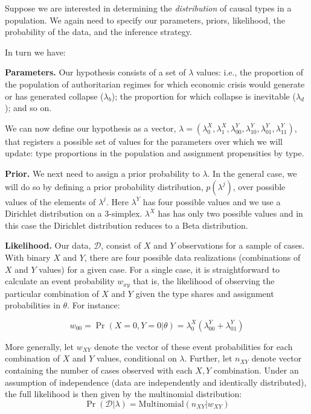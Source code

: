 \documentclass[12pt,]{book}
\begin{document}
Suppose we are interested in determining the \emph{distribution} of causal types in a population. We again need to specify our parameters, priors, likelihood, the probability of the data, and the inference strategy.

In turn we have:

\textbf{Parameters.} Our hypothesis consists of a set of \(\lambda\) values: i.e., the proportion of the population of authoritarian regimes for which economic crisis would generate or has generated collapse (\(\lambda_b\)); the proportion for which collapse is inevitable (\(\lambda_d\)); and so on.

We can now define our hypothesis as a vector, \(\lambda = (\lambda^X_0,\lambda^X_1,\lambda^Y_{00},\lambda^Y_{10},\lambda^Y_{01}, \lambda^Y_{11})\), that registers a possible set of values for the parameters over which we will update: type proportions in the population and assignment propensities by type.

\textbf{Prior.} We next need to assign a prior probability to \(\lambda\). In the general case, we will do so by defining a prior probability distribution, \(p(\lambda^j)\), over possible values of the elements of \(\lambda^j\). Here \(\lambda^Y\) has four possible values and we use a Dirichlet distribution on a 3-simplex. \(\lambda^X\) has has only two possible values and in this case the Dirichlet distribution reduces to a Beta distribution.

\textbf{Likelihood.} Our data, \(\mathcal{D}\), consist of \(X\) and \(Y\) observations for a sample of cases. With binary \(X\) and \(Y\), there are four possible data realizations (combinations of \(X\) and \(Y\) values) for a given case. For a single case, it is straightforward to calculate an event probability \(w_{xy}\) \textbar{} that is, the likelihood of observing the particular combination of \(X\) and \(Y\) given the type shares and assignment probabilities in \(\theta\). For instance:

\[w_{00}=\Pr(X=0, Y=0|\theta)=\lambda^X_0(\lambda^Y_{00} + \lambda^Y_{01})\]

More generally, let \(w_{XY}\) denote the vector of these event probabilities for each combination of \(X\) and \(Y\) values, conditional on \(\lambda\). Further, let \(n_{XY}\) denote vector containing the number of cases observed with each \(X,Y\) combination. Under an assumption of independence (data are independently and identically distributed), the full likelihood is then given by the multinomial distribution:
\[\Pr(\mathcal{D}|\lambda)= \text{Multinomial}(n_{XY}  | w_{XY})\]
\end{document}
